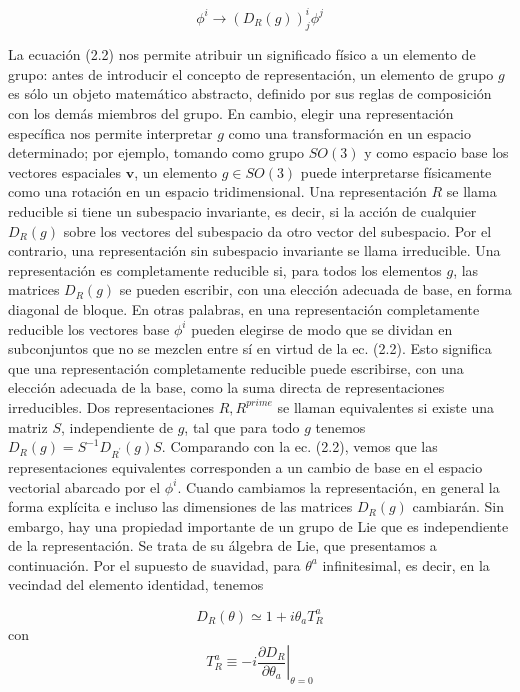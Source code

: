   \begin{equation*}
    \phi^{i} \rightarrow\left(D_{R}(g)\right)_{j}^{i} \phi^{j} \tag{2.2}
    \end{equation*}

  La ecuación (2.2) nos permite atribuir un significado físico a un elemento de grupo: antes de introducir el concepto de representación, un elemento de grupo $g$ es sólo un objeto matemático abstracto, definido por sus reglas de composición con los demás miembros del grupo. En cambio, elegir una representación específica nos permite interpretar $g$ como una transformación en un espacio determinado; por ejemplo, tomando como grupo $S O(3)$ y como espacio base los vectores espaciales $\mathbf{v}$, un elemento $g \in S O(3)$ puede interpretarse físicamente como una rotación en un espacio tridimensional.
Una representación $R$ se llama reducible si tiene un subespacio invariante, es decir, si la acción de cualquier $D_{R}(g)$ sobre los vectores del subespacio da otro vector del subespacio. Por el contrario, una representación sin subespacio invariante se llama irreducible. Una representación es completamente reducible si, para todos los elementos $g$, las matrices $D_{R}(g)$ se pueden escribir, con una elección adecuada de base, en forma diagonal de bloque. En otras palabras, en una representación completamente reducible los vectores base $\phi^{i}$ pueden elegirse de modo que se dividan en subconjuntos que no se mezclen entre sí en virtud de la ec. (2.2). Esto significa que una representación completamente reducible puede escribirse, con una elección adecuada de la base, como la suma directa de representaciones irreducibles.
Dos representaciones $R, R^{{prime}}$ se llaman equivalentes si existe una matriz $S$, independiente de $g$, tal que para todo $g$ tenemos $D_{R}(g)=S^{-1} D_{R^{\prime}}(g) S$. Comparando con la ec. (2.2), vemos que las representaciones equivalentes corresponden a un cambio de base en el espacio vectorial abarcado por el $\phi^{i}$.
Cuando cambiamos la representación, en general la forma explícita e incluso las dimensiones de las matrices $D_{R}(g)$ cambiarán. Sin embargo, hay una propiedad importante de un grupo de Lie que es independiente de la representación. Se trata de su álgebra de Lie, que presentamos a continuación.
Por el supuesto de suavidad, para $\theta^{a}$ infinitesimal, es decir, en la vecindad del elemento identidad, tenemos

  \begin{equation*}
    D_{R}(\theta) \simeq 1+i \theta_{a} T_{R}^{a} \tag{2.3}
    \end{equation*}
    con
  \begin{equation*}
    T_{R}^{a} \equiv-\left.i \frac{\partial D_{R}}{\partial \theta_{a}}\right|_{\theta=0} \tag{2.4}
    \end{equation*}

